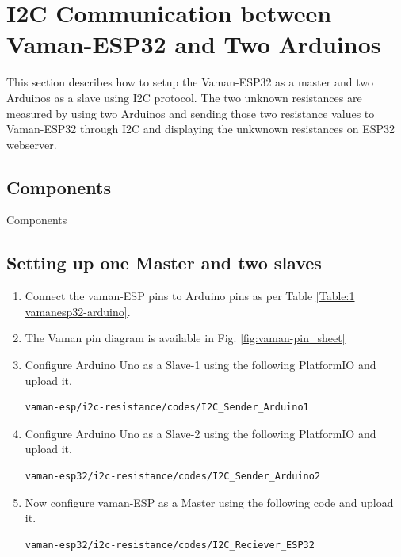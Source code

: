 \section{I2C Communication between Vaman-ESP32 and Two Arduinos}
This section describes how to setup the Vaman-ESP32 as a master and two Arduinos
as a slave using I2C protocol. The two unknown resistances are measured by 
using two Arduinos and sending those two resistance values to Vaman-ESP32 
through I2C and displaying the unkwnown resistances on ESP32 webserver.
\subsection{Components}
\begin{table}[!ht]
\centering

\caption{Components}
\label{table:}
\end{table}
\subsection{Setting up one Master and two slaves}
\begin{enumerate}[label=\thesection.\arabic*.,ref=\thesection.\theenumi]
\item
Connect the vaman-ESP pins to Arduino pins as per Table \ref{Table:1 vamanesp32-arduino}.
\begin{table}[!ht]
\centering

\caption{}
\label{Table:1 vamanesp32-arduino}
\end{table}
\item The Vaman pin diagram is available in Fig. \ref{fig:vaman-pin_sheet}
\item
Configure Arduino Uno as a Slave-1 using the following PlatformIO and upload it.
\begin{lstlisting}
vaman-esp/i2c-resistance/codes/I2C_Sender_Arduino1
\end{lstlisting}

\item
Configure Arduino Uno as a Slave-2 using the following PlatformIO and upload it.
\begin{lstlisting}
vaman-esp32/i2c-resistance/codes/I2C_Sender_Arduino2
\end{lstlisting}

\item
Now configure vaman-ESP as a Master using the following code and upload it.
\begin{lstlisting}
vaman-esp32/i2c-resistance/codes/I2C_Reciever_ESP32
\end{lstlisting}
\end{enumerate}
